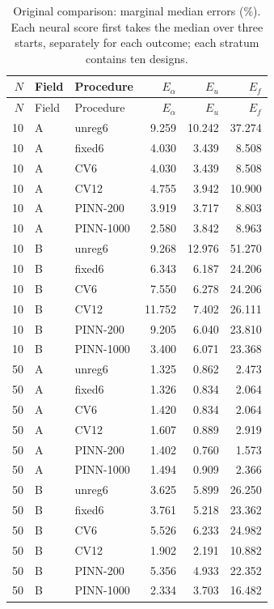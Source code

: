 \small
\begin{longtable}{rllrrr}
\caption{Original comparison: marginal median errors (\%). Each neural score first takes the median over three starts, separately for each outcome; each stratum contains ten designs.}\label{tab:original}\\
\toprule
$N$ & Field & Procedure & $E_\alpha$ & $E_u$ & $E_f$\\\midrule
\endfirsthead
\toprule
$N$ & Field & Procedure & $E_\alpha$ & $E_u$ & $E_f$\\\midrule
\endhead
10 & A & unreg6 & 9.259 & 10.242 & 37.274\\
10 & A & fixed6 & 4.030 & 3.439 & 8.508\\
10 & A & CV6 & 4.030 & 3.439 & 8.508\\
10 & A & CV12 & 4.755 & 3.942 & 10.900\\
10 & A & PINN-200 & 3.919 & 3.717 & 8.803\\
10 & A & PINN-1000 & 2.580 & 3.842 & 8.963\\
10 & B & unreg6 & 9.268 & 12.976 & 51.270\\
10 & B & fixed6 & 6.343 & 6.187 & 24.206\\
10 & B & CV6 & 7.550 & 6.278 & 24.206\\
10 & B & CV12 & 11.752 & 7.402 & 26.111\\
10 & B & PINN-200 & 9.205 & 6.040 & 23.810\\
10 & B & PINN-1000 & 3.400 & 6.071 & 23.368\\
50 & A & unreg6 & 1.325 & 0.862 & 2.473\\
50 & A & fixed6 & 1.326 & 0.834 & 2.064\\
50 & A & CV6 & 1.420 & 0.834 & 2.064\\
50 & A & CV12 & 1.607 & 0.889 & 2.919\\
50 & A & PINN-200 & 1.402 & 0.760 & 1.573\\
50 & A & PINN-1000 & 1.494 & 0.909 & 2.366\\
50 & B & unreg6 & 3.625 & 5.899 & 26.250\\
50 & B & fixed6 & 3.761 & 5.218 & 23.362\\
50 & B & CV6 & 5.526 & 6.233 & 24.982\\
50 & B & CV12 & 1.902 & 2.191 & 10.882\\
50 & B & PINN-200 & 5.356 & 4.933 & 22.352\\
50 & B & PINN-1000 & 2.334 & 3.703 & 16.482\\
\bottomrule
\end{longtable}
